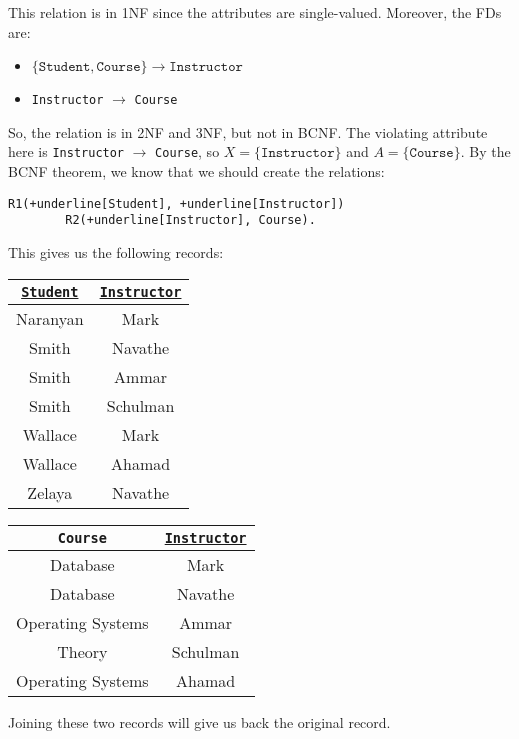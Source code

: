 \documentclass[a4paper, openany]{memoir}
\theoremstyle{definition}
\begin{document}
    \begin{answer}
        This relation is in 1NF since the attributes are single-valued. Moreover, the FDs are:
        \begin{itemize}
            \item $\{\texttt{Student}, \texttt{Course}\} \to \texttt{Instructor}$
            \item \texttt{Instructor} $\to$ \texttt{Course}
        \end{itemize}
        So, the relation is in 2NF and 3NF, but not in BCNF. The violating attribute here is \texttt{Instructor} $\to$ \texttt{Course}, so $X = \{\texttt{Instructor}\}$ and $A = \{\texttt{Course}\}$. By the BCNF theorem, we know that we should create the relations:
        \begin{Verbatim}[commandchars=+\[\]]
        R1(+underline[Student], +underline[Instructor])
        R2(+underline[Instructor], Course).
        \end{Verbatim}
        This gives us the following records:
        \begin{table}[H]
            \centering
            \begin{tabular}{|c|c|}
                \hline
                \texttt{\underline{Student}} & \texttt{\underline{Instructor}} \\
                \hline
                Naranyan & Mark \\
                Smith & Navathe \\
                Smith & Ammar \\
                Smith & Schulman \\
                Wallace & Mark \\
                Wallace & Ahamad \\
                Zelaya & Navathe \\
                \hline
            \end{tabular}
        \end{table}
        \begin{table}[H]
            \centering
            \begin{tabular}{|c|c|}
                \hline
                \texttt{Course} & \texttt{\underline{Instructor}} \\
                \hline
                Database & Mark \\
                Database & Navathe \\
                Operating Systems & Ammar \\
                Theory & Schulman \\
                Operating Systems & Ahamad \\
                \hline
            \end{tabular}
        \end{table}
        \noindent Joining these two records will give us back the original record.
    \end{answer}
\end{document}
